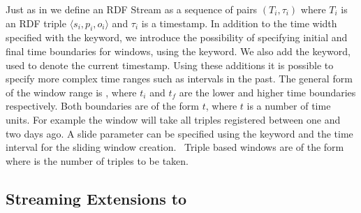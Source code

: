 Just as in \cite{Barbieri_2010} we define an RDF Stream as a sequence of pairs $(T_i,\tau_i)$ where $T_i$ is an RDF
triple $\langle s_i,p_i,o_i \rangle$ and $\tau_i$ is a timestamp.
In addition to the time width specified with the  keyword, we introduce the possibility of specifying initial and final time boundaries for windows, using the  keyword. We also add the  keyword, used to denote the current timestamp. Using these additions it is possible to specify more complex time ranges such as intervals in the past. The general form of the window range is \serifa{[RANGE $t_i$ TO $t_f$]}, where $t_i$ and $t_f$ are the lower and higher time boundaries respectively. Both boundaries are of the form $t$, where $t$ is a number of time units. For example the window  will take all triples registered between one and two days ago. %
A slide parameter can be specified using the  keyword and the time interval for the sliding window creation.\ %
Triple based windows are of the form \serifa{[ROWS N]} where  is the number of triples to be taken.





\subsection{Streaming Extensions to \rtwoo}
\label{streamingr2osyntax}

